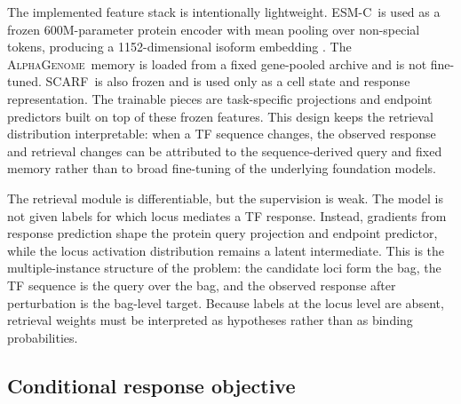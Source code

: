 \documentclass{article}
\newcommand{\ag}{\textsc{AlphaGenome}}
\newcommand{\scarf}{\textsc{SCARF}}
\newcommand{\esm}{\textsc{ESM-C}}
\begin{document}
The implemented feature stack is intentionally lightweight. \esm\ is used as a frozen 600M-parameter protein encoder with mean pooling over non-special tokens, producing a 1152-dimensional isoform embedding \citep{evolutionaryscale2024}. The \ag\ memory is loaded from a fixed gene-pooled archive and is not fine-tuned. \scarf\ is also frozen and is used only as a cell state and response representation. The trainable pieces are task-specific projections and endpoint predictors built on top of these frozen features. This design keeps the retrieval distribution interpretable: when a TF sequence changes, the observed response and retrieval changes can be attributed to the sequence-derived query and fixed memory rather than to broad fine-tuning of the underlying foundation models.

The retrieval module is differentiable, but the supervision is weak. The model is not given labels for which locus mediates a TF response. Instead, gradients from response prediction shape the protein query projection and endpoint predictor, while the locus activation distribution remains a latent intermediate. This is the multiple-instance structure of the problem: the candidate loci form the bag, the TF sequence is the query over the bag, and the observed response after perturbation is the bag-level target. Because labels at the locus level are absent, retrieval weights must be interpreted as hypotheses rather than as binding probabilities.

\subsection{Conditional response objective}
\end{document}
